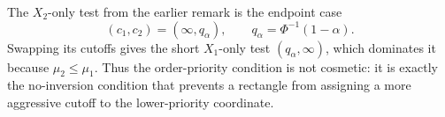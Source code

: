 \documentclass[12pt]{article}
\theoremstyle{definition}
\theoremstyle{remark}
\begin{document}
The $X_2$-only test from the earlier remark is the endpoint case
\[
(c_1,c_2)=(\infty,q_\alpha),
\qquad
q_\alpha=\Phi^{-1}(1-\alpha).
\]
Swapping its cutoffs gives the short $X_1$-only test $(q_\alpha,\infty)$, which dominates it because $\mu_2\le\mu_1$. Thus the order-priority condition is not cosmetic: it is exactly the no-inversion condition that prevents a rectangle from assigning a more aggressive cutoff to the lower-priority coordinate.
\end{document}
